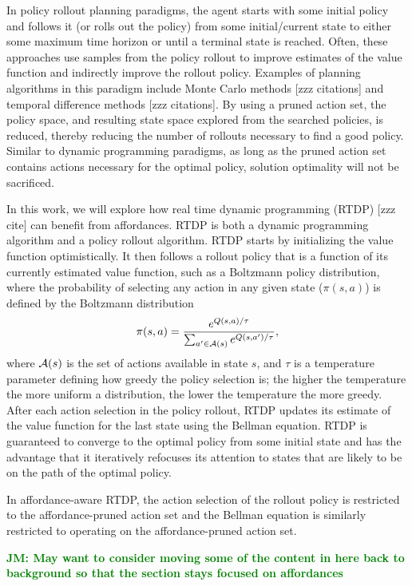\documentclass[]{article}
\newcommand{\jmnote}[1]{\textcolor{Green}{\textbf{JM: #1}}}
\begin{document}
In policy rollout planning paradigms, the agent starts with some initial policy and follows it (or rolls out the policy) from some initial/current state to either some maximum time horizon or until a terminal state is reached. Often, these approaches use samples from the policy rollout to improve estimates of the value function and indirectly improve the rollout policy. Examples of planning algorithms in this paradigm include Monte Carlo methods [zzz citations] and temporal difference methods [zzz citations]. By using a pruned action set, the policy space, and resulting state space explored from the searched policies, is reduced, thereby reducing the number of rollouts necessary to find a good policy. Similar to dynamic programming paradigms, as long as the pruned action set contains actions necessary for the optimal policy, solution optimality will not be sacrificed.

In this work, we will explore how real time dynamic programming (RTDP) [zzz cite] can benefit from affordances. RTDP is both a dynamic programming algorithm and a policy rollout algorithm. RTDP starts
by initializing the value function optimistically. It then follows a rollout policy that is a function
of its currently estimated value function, such as a Boltzmann policy distribution, where the probability
of selecting any action in any given state ($\pi(s,a)$) is defined by the Boltzmann distribution
\begin{equation}
\label{eq:boltzmann}
\pi(s,a) = \frac{e^{Q(s,a) / \tau}}{\sum_{a' \in {\cal A}(s)} e^{Q(s,a') / \tau}},
\end{equation}
where ${\cal A}(s)$ is the set of actions available in state $s$, and $\tau$ is a temperature parameter
defining how greedy the policy selection is; the higher the temperature the more uniform a distribution,
the lower the temperature the more greedy.
After each action selection in the policy rollout, RTDP updates its estimate of the value function for the
last state using the Bellman equation. RTDP is guaranteed to converge to the optimal policy from some initial state and has the advantage that it iteratively refocuses its attention to states that are likely
to be on the path of the optimal policy.

In affordance-aware RTDP, the action selection of the rollout policy is restricted to the affordance-pruned action set and the Bellman equation is similarly restricted to operating on the affordance-pruned action set.

\jmnote{May want to consider moving some of the content in here back to background so that the section stays focused on affordances}
\end{document}
